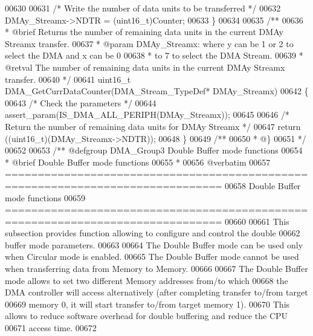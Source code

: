 \begin{DoxyCode}
00630 
00631   \textcolor{comment}{/* Write the number of data units to be transferred */}
00632   DMAy\_Streamx->NDTR = (uint16\_t)Counter;
00633 \}
00634 
00635 \textcolor{comment}{/**}
00636 \textcolor{comment}{  * @brief  Returns the number of remaining data units in the current DMAy Streamx transfer.}
00637 \textcolor{comment}{  * @param  DMAy\_Streamx: where y can be 1 or 2 to select the DMA and x can be 0}
00638 \textcolor{comment}{  *          to 7 to select the DMA Stream.}
00639 \textcolor{comment}{  * @retval The number of remaining data units in the current DMAy Streamx transfer.}
00640 \textcolor{comment}{  */}
00641 uint16\_t DMA_GetCurrDataCounter(DMA\_Stream\_TypeDef* DMAy\_Streamx)
00642 \{
00643   \textcolor{comment}{/* Check the parameters */}
00644   assert_param(IS\_DMA\_ALL\_PERIPH(DMAy\_Streamx));
00645 
00646   \textcolor{comment}{/* Return the number of remaining data units for DMAy Streamx */}
00647   \textcolor{keywordflow}{return} ((uint16\_t)(DMAy\_Streamx->NDTR));
00648 \}
00649 \textcolor{comment}{/**}
00650 \textcolor{comment}{  * @\}}
00651 \textcolor{comment}{  */}
00652 
00653 \textcolor{comment}{/** @defgroup DMA\_Group3 Double Buffer mode functions}
00654 \textcolor{comment}{ *  @brief   Double Buffer mode functions }
00655 \textcolor{comment}{ *}
00656 \textcolor{comment}{@verbatim   }
00657 \textcolor{comment}{ ===============================================================================}
00658 \textcolor{comment}{                         Double Buffer mode functions}
00659 \textcolor{comment}{ ===============================================================================  }
00660 \textcolor{comment}{}
00661 \textcolor{comment}{  This subsection provides function allowing to configure and control the double }
00662 \textcolor{comment}{  buffer mode parameters.}
00663 \textcolor{comment}{  }
00664 \textcolor{comment}{  The Double Buffer mode can be used only when Circular mode is enabled.}
00665 \textcolor{comment}{  The Double Buffer mode cannot be used when transferring data from Memory to Memory.}
00666 \textcolor{comment}{  }
00667 \textcolor{comment}{  The Double Buffer mode allows to set two different Memory addresses from/to which}
00668 \textcolor{comment}{  the DMA controller will access alternatively (after completing transfer to/from target}
00669 \textcolor{comment}{  memory 0, it will start transfer to/from target memory 1).}
00670 \textcolor{comment}{  This allows to reduce software overhead for double buffering and reduce the CPU}
00671 \textcolor{comment}{  access time.}
00672 \textcolor{comment}{}

\end{DoxyCode}
